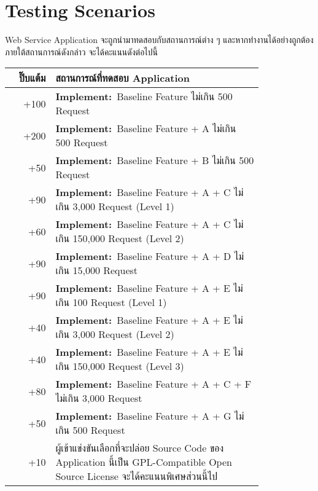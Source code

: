 

\section{Testing Scenarios}

Web Service Application จะถูกนำมาทดสอบกับสถานการณ์ต่าง ๆ และหากทำงานได้อย่างถูกต้องภายใต้สถานการณ์ดังกล่าว จะได้คะแนนดังต่อไปนี้

\begin{center}
\smallskip\small
\begin{tabular}{r@{\qquad}p{0.825\linewidth}}
\toprule
ปิ๊บแต้ม & สถานการณ์ที่ทดสอบ Application \\
\midrule
+100 & \textbf{Implement:\,} Baseline Feature  \hfill ไม่เกิน 500 Request \\
+200 & \textbf{Implement:\,} Baseline Feature + A  \hfill ไม่เกิน 500 Request \\
 +50 & \textbf{Implement:\,} Baseline Feature + B  \hfill ไม่เกิน 500 Request \\
 +90 & \textbf{Implement:\,} Baseline Feature + A + C  \hfill ไม่เกิน 3,000 Request (Level 1) \\
 +60 & \textbf{Implement:\,} Baseline Feature + A + C  \hfill ไม่เกิน 150,000 Request (Level 2) \\
 +90 & \textbf{Implement:\,} Baseline Feature + A + D  \hfill ไม่เกิน 15,000 Request \\
 +90 & \textbf{Implement:\,} Baseline Feature + A + E  \hfill ไม่เกิน 100 Request (Level 1) \\
 +40 & \textbf{Implement:\,} Baseline Feature + A + E  \hfill ไม่เกิน 3,000 Request (Level 2)\\
 +40 & \textbf{Implement:\,} Baseline Feature + A + E  \hfill ไม่เกิน 150,000 Request (Level 3) \\
 +80 & \textbf{Implement:\,} Baseline Feature + A + C + F  \hfill ไม่เกิน 3,000 Request \\
 +50 & \textbf{Implement:\,} Baseline Feature + A + G  \hfill ไม่เกิน 500 Request \\
\midrule
 +10 & ผู้เข้าแข่งขันเลือกที่จะปล่อย Source Code ของ Application นี้เป็น GPL-Compatible Open Source License จะได้คะแนนพิเศษส่วนนี้ไป \\
\bottomrule
\end{tabular}
\end{center}

